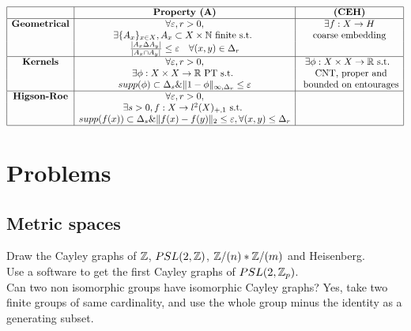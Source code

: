 \begin{table}[h]
\[\begin{array}{|c|c|c|}
\hline
                                                     &  \textbf{Property (A)}  & \textbf{(CEH)}    \\
\hline
\textbf{Geometrical} &  
		\forall \varepsilon, r>0,   & 
		\exists f: X \rightarrow H   \\ 
			& \exists \{A_x\}_{x\in X}, A_x\subset X\times \mathbb N \text{ finite s.t. } &\text{coarse embedding} \\
			& \frac{|A_x\Delta A_y|}{|A_x\cap A_y|}\leq \varepsilon \quad \forall (x,y)\in \Delta_r & \\
\hline
\textbf{Kernels} &
		\forall \varepsilon, r>0, &
		\exists \phi: X\times X\rightarrow \mathbb R \text{ s.t. } \\
			&\exists \phi: X\times X\rightarrow \mathbb R \text{ PT s.t. } & \text{ CNT, proper and} \\
			&supp(\phi)\subset \Delta_s \& \|1-\phi\|_{\infty,\Delta_r}\leq \varepsilon  & \text{ bounded on entourages}\\
\hline
\textbf{Higson-Roe} &
		\forall \varepsilon, r>0, &
		\\
			&\exists s>0, f: X\rightarrow  l^2(X)_{+,1}\text{ s.t. } & \\
		&   supp(f(x))\subset \Delta_s \& \|f(x) -f(y)\|_2\leq\varepsilon , \forall (x,y)\leq \Delta_r & \\
\hline
\end{array}\]
\end{table} 

\section{Problems}

\subsection{Metric spaces}
Draw the Cayley graphs of $\mathbb Z$, $PSL(2,\mathbb Z)$, $\mathbb Z / (n) \ast \mathbb Z / (m)$ and Heisenberg.\\

Use a software to get the first Cayley graphs of $PSL(2,\mathbb Z_p)$.\\

Can two non isomorphic groups have isomorphic Cayley graphs? Yes, take two finite groups of same cardinality, and use the whole group minus the identity as a generating subset.\\

